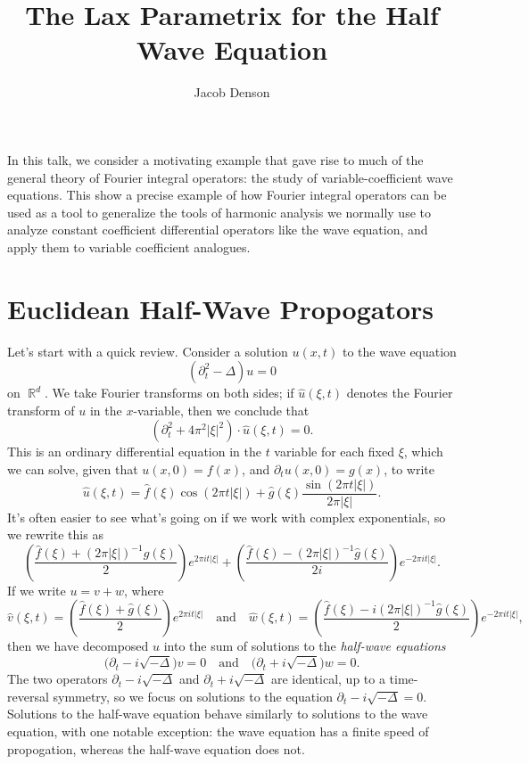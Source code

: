 \documentclass{article}
\title{The Lax Parametrix for the Half Wave Equation}
\author{Jacob Denson}
\theoremstyle{plain}
\theoremstyle{remark}
\theoremstyle{definition}
\DeclareMathOperator{\RR}{\mathbb{R}}
\begin{document}
\maketitle

In this talk, we consider a motivating example that gave rise to much of the general theory of Fourier integral operators: the study of variable-coefficient wave equations. This show a precise example of how Fourier integral operators can be used as a tool to generalize the tools of harmonic analysis we normally use to analyze constant coefficient differential operators like the wave equation, and apply them to variable coefficient analogues.

\section{Euclidean Half-Wave Propogators}

Let's start with a quick review. Consider a solution $u(x,t)$ to the wave equation
%
\[ (\partial_t^2 - \Delta) u = 0 \]
%
on $\RR^d$. We take Fourier transforms on both sides; if $\widehat{u}(\xi,t)$ denotes the Fourier transform of $u$ in the $x$-variable, then we conclude that
%
\[ (\partial_t^2 + 4 \pi^2 |\xi|^2) \cdot \widehat{u}(\xi,t) = 0. \]
%
This is an ordinary differential equation in the $t$ variable for each fixed $\xi$, which we can solve, given that $u(x,0) = f(x)$, and $\partial_t u(x,0) = g(x)$, to write
%
\[ \widehat{u}(\xi,t) = \widehat{f}(\xi) \cos(2 \pi t |\xi|) + \widehat{g}(\xi) \frac{\sin(2 \pi t |\xi|)}{2 \pi |\xi|}. \]
%
It's often easier to see what's going on if we work with complex exponentials, so we rewrite this as
%
\[ \left( \frac{\widehat{f}(\xi) + (2 \pi |\xi|)^{-1} \widehat{g}(\xi)}{2} \right) e^{2 \pi i t |\xi|} + \left( \frac{\widehat{f}(\xi) - (2 \pi |\xi|)^{-1} \widehat{g}(\xi)}{2i} \right) e^{-2 \pi i t |\xi|}. \]
%
If we write $u = v + w$, where
%
\[ \widehat{v}(\xi,t) = \left( \frac{\widehat{f}(\xi) + \widehat{g}(\xi)}{2} \right) e^{2 \pi i t |\xi|} \quad\text{and}\quad \widehat{w}(\xi,t) = \left( \frac{\widehat{f}(\xi) - i (2 \pi |\xi|)^{-1} \widehat{g}(\xi)}{2} \right) e^{-2 \pi i t |\xi|}, \]
%
then we have decomposed $u$ into the sum of solutions to the \emph{half-wave equations}
%
\[ \Big( \partial_t - i \sqrt{-\Delta} \Big) v = 0 \quad\text{and}\quad \Big(\partial_t + i \sqrt{-\Delta} \Big) w = 0. \]
%
The two operators $\partial_t - i \sqrt{-\Delta}$ and $\partial_t + i \sqrt{-\Delta}$ are identical, up to a time-reversal symmetry, so we focus on solutions to the equation $\partial_t - i \sqrt{-\Delta} = 0$. Solutions to the half-wave equation behave similarly to solutions to the wave equation, with one notable exception: the wave equation has a finite speed of propogation, whereas the half-wave equation does not.
\end{document}

